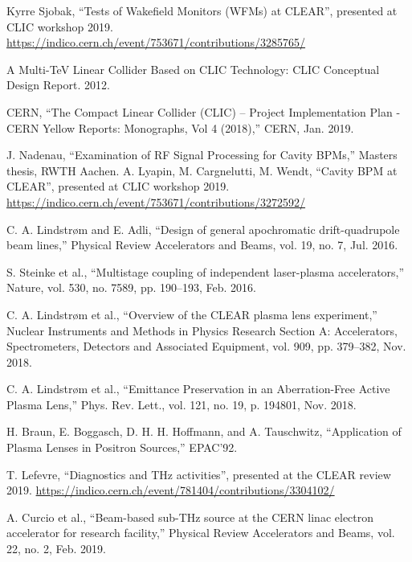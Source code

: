 \documentclass[a4paper,
               keeplastbox,   %
               ]{jacow}
\begin{document}
\begin{thebibliography}{99}
 Kyrre Sjobak, ``Tests of Wakefield Monitors (WFMs) at CLEAR'', presented at CLIC workshop 2019. \url{https://indico.cern.ch/event/753671/contributions/3285765/}

 A Multi-TeV Linear Collider Based on CLIC Technology: CLIC Conceptual Design Report. 2012.

 CERN, “The Compact Linear Collider (CLIC) – Project Implementation Plan - CERN Yellow Reports: Monographs, Vol 4 (2018),” CERN, Jan. 2019.

 J. Nadenau, “Examination of RF Signal Processing for Cavity BPMs,” Masters thesis, RWTH Aachen.
 A. Lyapin, M. Cargnelutti, M. Wendt, ``Cavity BPM at CLEAR'', presented at CLIC workshop 2019. \url{https://indico.cern.ch/event/753671/contributions/3272592/}

 C. A. Lindstrøm and E. Adli, “Design of general apochromatic drift-quadrupole beam lines,” Physical Review Accelerators and Beams, vol. 19, no. 7, Jul. 2016.

 S. Steinke et al., “Multistage coupling of independent laser-plasma accelerators,” Nature, vol. 530, no. 7589, pp. 190–193, Feb. 2016.

 C. A. Lindstrøm et al., “Overview of the CLEAR plasma lens experiment,” Nuclear Instruments and Methods in Physics Research Section A: Accelerators, Spectrometers, Detectors and Associated Equipment, vol. 909, pp. 379–382, Nov. 2018.

 C. A. Lindstrøm et al., “Emittance Preservation in an Aberration-Free Active Plasma Lens,” Phys. Rev. Lett., vol. 121, no. 19, p. 194801, Nov. 2018.

 H. Braun, E. Boggasch, D. H. H. Hoffmann, and A. Tauschwitz, “Application of Plasma Lenses in Positron Sources,” EPAC'92.


 T. Lefevre, ``Diagnostics and THz activities'', presented at the CLEAR review 2019. \url{https://indico.cern.ch/event/781404/contributions/3304102/}

 A. Curcio et al., “Beam-based sub-THz source at the CERN linac electron accelerator for research facility,” Physical Review Accelerators and Beams, vol. 22, no. 2, Feb. 2019.


\end{thebibliography}
\end{document}
